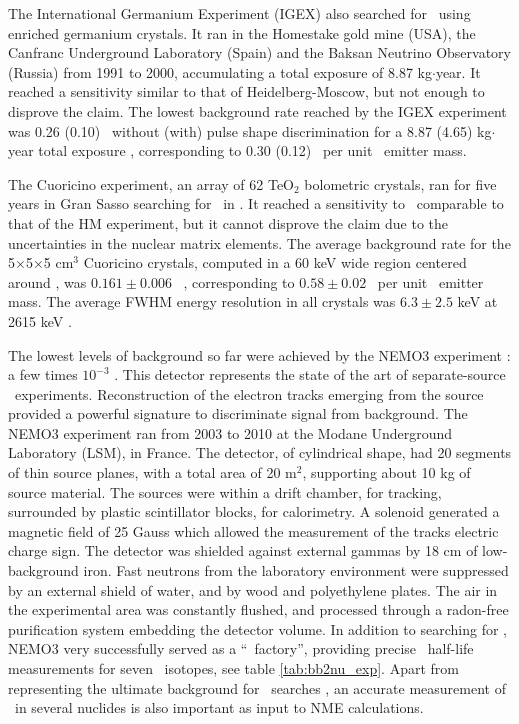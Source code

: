 The International Germanium Experiment (IGEX) \cite{IGEX:2002bce} also searched for \bbonu\ using enriched germanium crystals. It ran in the Homestake gold mine (USA), the Canfranc Underground Laboratory (Spain) and the Baksan Neutrino Observatory (Russia) from 1991 to 2000, accumulating a total exposure of 8.87 kg$\cdot$year. It reached a sensitivity similar to that of Heidelberg-Moscow, but not enough to disprove the claim. The lowest background rate reached by the IGEX experiment was 0.26 (0.10) \ckky\ without (with) pulse shape discrimination for a 8.87 (4.65) kg$\cdot$year total exposure \cite{Gonzalez:2003pr}, corresponding to 0.30 (0.12) \ckkbby\ per unit \bb\ emitter mass.

The Cuoricino experiment, an array of 62 TeO$_{2}$ bolometric crystals, ran for five years in Gran Sasso searching for \bbonu\ in \TE. It reached a sensitivity to \mbb\ comparable to that of the HM experiment, but it cannot disprove the claim due to the uncertainties in the nuclear matrix elements. The average background rate for the 5$\times$5$\times$5 cm$^3$ Cuoricino crystals, computed in a 60 keV wide region centered around \Qbb , was $0.161\pm 0.006$ \ckky\ \cite{CUORE:2011boi}, corresponding to $0.58\pm 0.02$ \ckkbby\ per unit \bb\ emitter mass. The average FWHM energy resolution in all crystals was $6.3\pm 2.5$ keV at 2615 keV \cite{CUORE:2011boi}.

The lowest levels of background so far were achieved by the NEMO3 experiment \cite{NEMO:2009ewu}: a few times $10^{-3}$ \ckky . This detector represents the state of the art of separate-source \bb\ experiments. Reconstruction of the electron tracks emerging from the source provided a powerful signature to discriminate signal from background. The NEMO3 experiment ran from 2003 to 2010 at the Modane Underground Laboratory (LSM), in France. The detector, of cylindrical shape, had 20 segments of thin source planes, with a total area of 20 m$^{2}$, supporting about 10 kg of source material. The sources were within a drift chamber, for tracking, surrounded by plastic scintillator blocks, for calorimetry. A solenoid generated  a magnetic field of 25 Gauss which allowed the measurement of the tracks electric charge sign. The detector was shielded against external gammas by 18 cm of low-background iron. Fast neutrons from the laboratory environment were suppressed by an external shield of water, and by wood and polyethylene plates. The air in the experimental area was constantly flushed, and processed through a radon-free purification system embedding the detector volume. In addition to searching for \bbonu , NEMO3 very successfully served as a ``\bbtnu\ factory'', providing precise \bbtnu\ half-life measurements for seven \bb\ isotopes, see table \ref{tab:bb2nu_exp}. Apart from representing the ultimate background for \bbonu\ searches , an accurate measurement of \bbtnu\ in several nuclides is also important as input to NME calculations. 